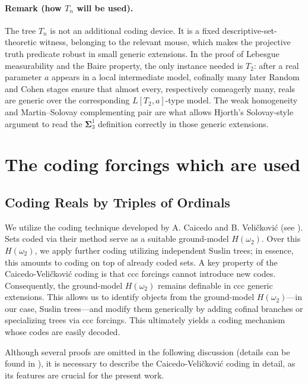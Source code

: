 \documentclass[a4paper,11pt]{article}
\begin{document}
\paragraph{Remark (how $T_n$ will be used).}\label{rem:tn-use-later}
The tree $T_n$ is not an additional coding device.  It is a fixed descriptive-set-theoretic witness, belonging to the relevant mouse, which makes the projective truth predicate robust in small generic extensions.  In the proof of Lebesgue measurability and the Baire property, the only instance needed is $T_2$: after a real parameter $a$ appears in a local intermediate model, cofinally many later Random and Cohen stages ensure that almost every, respectively comeagerly many, reals are generic over the corresponding $L[T_2,a]$-type model.  The weak homogeneity and Martin--Solovay complementing pair are what allows Hjorth's Solovay-style argument to read the $\boldsymbol{\Sigma}^1_3$ definition correctly in those generic extensions.

\section{The coding forcings which are used}

\subsection{Coding Reals by Triples of Ordinals}

We utilize the coding technique developed by A. Caicedo and B. Veli\v{c}kovi\'{c} (see \cite{CV}). Sets coded via their method serve as a suitable ground-model $H(\omega_2)$. Over this $H(\omega_2)$, we apply further coding utilizing independent Suslin trees; in essence, this amounts to coding on top of already coded sets. A key property of the Caicedo-Veli\v{c}kovi\'{c} coding is that ccc forcings cannot introduce new codes. Consequently, the ground-model $H(\omega_2)$ remains definable in ccc generic extensions. This allows us to identify objects from the ground-model $H(\omega_2)$—in our case, Suslin trees—and modify them generically by adding cofinal branches or specializing trees via ccc forcings. This ultimately yields a coding mechanism whose codes are easily decoded.

Although several proofs are omitted in the following discussion (details can be found in \cite{NS_saturated_and_definable}), it is necessary to describe the Caicedo-Veli\v{c}kovi\'{c} coding in detail, as its features are crucial for the present work.
\end{document}
